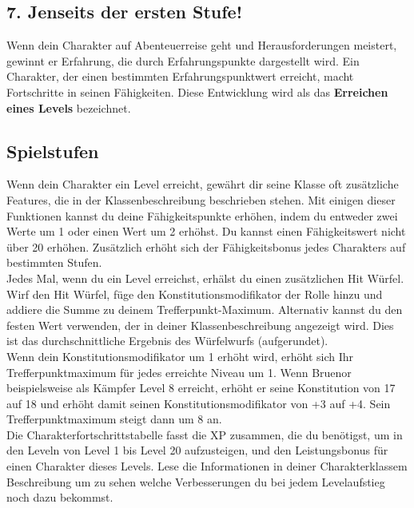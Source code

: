 \subsection{7. Jenseits der ersten Stufe!}
Wenn dein Charakter auf Abenteuerreise geht und Herausforderungen meistert, gewinnt er Erfahrung, die durch Erfahrungspunkte dargestellt wird. Ein Charakter, der einen bestimmten Erfahrungspunktwert erreicht, macht Fortschritte in seinen Fähigkeiten. Diese Entwicklung wird als das \textbf{Erreichen eines Levels} bezeichnet.\\

\subsection{Spielstufen}
Wenn dein Charakter ein Level erreicht, gewährt dir seine Klasse oft zusätzliche Features, die in der Klassenbeschreibung beschrieben stehen. Mit einigen dieser Funktionen kannst du deine Fähigkeitspunkte erhöhen, indem du entweder zwei Werte um 1 oder einen Wert um 2 erhöhst. Du kannst einen Fähigkeitswert nicht über 20 erhöhen. Zusätzlich erhöht sich der Fähigkeitsbonus jedes Charakters auf bestimmten Stufen.\\
Jedes Mal, wenn du ein Level erreichst, erhälst du einen zusätzlichen Hit Würfel. Wirf den Hit Würfel, füge den Konstitutionsmodifikator der Rolle hinzu und addiere die Summe zu deinem Trefferpunkt-Maximum. Alternativ kannst du den festen Wert verwenden, der in deiner Klassenbeschreibung angezeigt wird. Dies ist das durchschnittliche Ergebnis des Würfelwurfs (aufgerundet).\\
Wenn dein Konstitutionsmodifikator um 1 erhöht wird, erhöht sich Ihr Trefferpunktmaximum für jedes erreichte Niveau um 1. Wenn Bruenor beispielsweise als Kämpfer Level 8 erreicht, erhöht er seine Konstitution von 17 auf 18 und erhöht damit seinen Konstitutionsmodifikator von +3 auf +4. Sein Trefferpunktmaximum steigt dann um 8 an.\\
Die Charakterfortschrittstabelle fasst die XP zusammen, die du benötigst, um in den Leveln von Level 1 bis Level 20 aufzusteigen, und den Leistungsbonus für einen Charakter dieses Levels. Lese die Informationen in deiner Charakterklassem Beschreibung um zu sehen welche Verbesserungen du bei jedem Levelaufstieg noch dazu bekommst.

